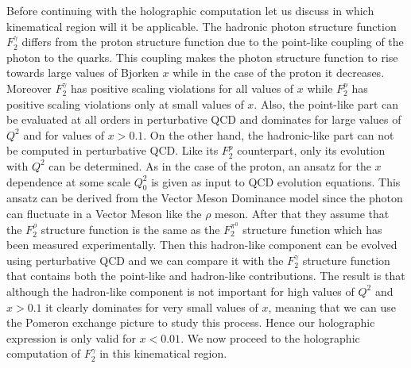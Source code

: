\documentclass[preprint, 12pt]{elsarticle}
\begin{document}
Before continuing with the holographic computation let us discuss in which kinematical region will it be applicable. The hadronic photon structure function $F_2^\gamma$ differs from the proton structure function due to the point-like coupling of the photon to the quarks. This coupling makes the photon structure function to rise towards large values of Bjorken $x$ while in the case of the proton it decreases. Moreover $F_2^\gamma$ has positive scaling violations for all values of $x$ while $F_2^p$ has positive scaling violations only at small values of $x$. Also, the point-like part can be evaluated at all orders in perturbative QCD and dominates for large values of $Q^2$ and for values of $x > 0.1$.
On the other hand, the hadronic-like part can not be computed in perturbative QCD. Like its $F_2^p$ counterpart, only its evolution with $Q^2$ can be determined. As in the case of the proton, an ansatz for the $x$ dependence at some scale $Q_0^2$ is given as input to QCD evolution equations. This ansatz can be derived from the Vector Meson Dominance model since the photon can fluctuate in a Vector Meson like the $\rho$ meson. After that they assume that the $F_2^\rho$ structure function is the same as the $F_2^{\pi^0}$ structure function which has been measured experimentally. Then this hadron-like component can be evolved using perturbative QCD and we can compare it with the $F_2^\gamma$ structure function that contains both the point-like and hadron-like contributions. The result is that although the hadron-like component is not important for high values of $Q^2$ and $x > 0.1$ it clearly dominates for very small values of $x$, meaning that we can use the Pomeron exchange picture to study this process. Hence our holographic expression is only valid for $x < 0.01$. We now proceed to the holographic computation of $F_2^\gamma$ in this kinematical region.
\end{document}
